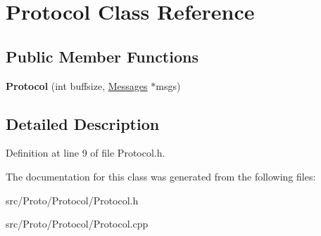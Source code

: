 \hypertarget{class_protocol}{
\section{Protocol Class Reference}
\label{class_protocol}
}
\subsection*{Public Member Functions}
\begin{DoxyCompactItemize}
\item 
\hypertarget{class_protocol_a9cc8d0ecfd74fca379135a036921856e}{
{\bfseries Protocol} (int buffsize, \hyperlink{class_messages}{Messages} $\ast$msgs)}
\label{class_protocol_a9cc8d0ecfd74fca379135a036921856e}

\end{DoxyCompactItemize}


\subsection{Detailed Description}


Definition at line 9 of file Protocol.h.



The documentation for this class was generated from the following files:\begin{DoxyCompactItemize}
\item 
src/Proto/Protocol/Protocol.h\item 
src/Proto/Protocol/Protocol.cpp\end{DoxyCompactItemize}
